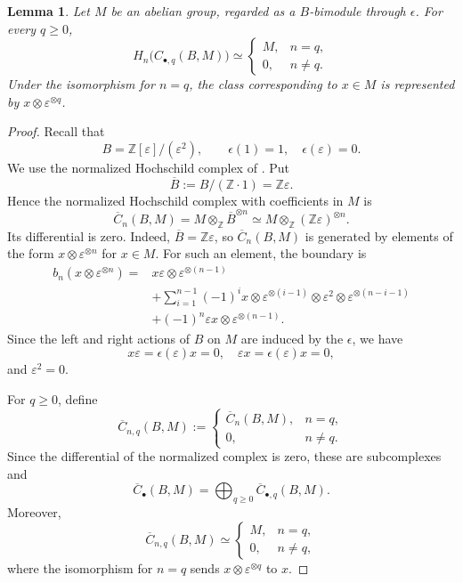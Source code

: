 \documentclass[a4paper,12pt,reqno]{amsart}
\numberwithin{equation}{section}
\newtheorem{lem}[lem]{Lemma}
\theoremstyle{definition}
\newcommand{\Z}{\mathbb{Z}}
\begin{document}
\begin{lem}\label{lem:HHnorm}
Let $M$ be an abelian group, regarded as a $B$-bimodule through $\epsilon$.
For every $q\geq0$,
\begin{equation}\label{eq:HH-norm-hom}
 H_n\bigl(C_{\bullet,q}(B,M)\bigr)
 \simeq
 \begin{cases}
 M,&n=q,\\
 0,&n\neq q.
 \end{cases}
\end{equation}
Under the isomorphism for $n=q$, the class corresponding to $x\in M$ is
represented by $x\otimes\varepsilon^{\otimes q}$.
\end{lem}
\begin{proof}
Recall that
\[
 B=\Z[\varepsilon]/(\varepsilon^2),
 \qquad
 \epsilon(1)=1,\quad \epsilon(\varepsilon)=0.
\]
We use the normalized Hochschild complex of
\cite[Definition~1.1.14]{Lod98}. 
Put 
\[
\overline B:= B/ (\Z\cdot 1) = \Z \varepsilon.
\]
Hence the normalized Hochschild complex with coefficients in $M$ is
\begin{equation}\label{eq:HH-normalized}
 \overline C_n(B,M)
 =M\otimes_{\Z}\overline B^{\otimes n}
 \simeq M\otimes_{\Z}(\Z\varepsilon)^{\otimes n}.
\end{equation}
Its differential is zero. 
Indeed,
$\overline B=\Z\varepsilon$, so $\overline C_n(B,M)$ is generated by
elements of the form
$x\otimes\varepsilon^{\otimes n}$ for $x\in M$.
For such an element, the boundary is 
\begin{align*}
 b_n(x\otimes\varepsilon^{\otimes n})
 ={}&
 x\varepsilon\otimes\varepsilon^{\otimes(n-1)}\\
 &+\sum_{i=1}^{n-1}(-1)^i
 x\otimes\varepsilon^{\otimes(i-1)}
 \otimes\varepsilon^2
 \otimes\varepsilon^{\otimes(n-i-1)}\\
 &+(-1)^n\varepsilon x\otimes\varepsilon^{\otimes(n-1)}.
\end{align*}
Since the left and right actions of $B$ on $M$ are induced by the
$\epsilon$, we have 
\[
 x\varepsilon=\epsilon(\varepsilon)x=0,
 \quad 
 \varepsilon x=\epsilon(\varepsilon)x=0, 
\]
and $\varepsilon^2 = 0$. 

For $q\geq0$, define
\[
 \overline C_{n,q}(B,M)
 :=
 \begin{cases}
  \overline C_n(B,M),&n=q,\\
  0,&n\neq q.
 \end{cases}
\]
Since the differential of the normalized complex is zero, these are
subcomplexes and
\[
 \overline C_\bullet(B,M)
 =
 \bigoplus_{q\geq0}\overline C_{\bullet,q}(B,M).
\]
Moreover,
\[
 \overline C_{n,q}(B,M)
 \simeq
 \begin{cases}
  M,&n=q,\\
  0,&n\neq q,
 \end{cases}
\]
where the isomorphism for $n=q$ sends
$x\otimes\varepsilon^{\otimes q}$ to $x$.



\end{proof}
\end{document}
